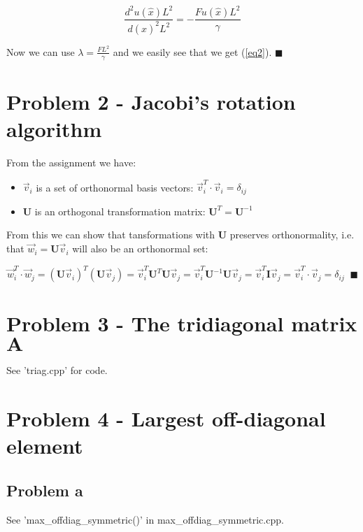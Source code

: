 \documentclass[english,notitlepage]{revtex4-1}  %
\begin{document}
\begin{equation*}
    \frac{d^2u(\hat{x})L^2}{d(\hat{x})^2L^2} = - \frac{Fu(\hat{x})L^2}{\gamma}
\end{equation*}

Now we can use $\lambda = \frac{FL^2}{\gamma}$ and we easily see that we get (\ref{eq2}). $\blacksquare$


\section*{Problem 2 - Jacobi’s rotation algorithm}

From the assignment we have:

\begin{itemize}
    \item $\vec{v}_i$ is a set of orthonormal basis vectors: $\vec{v}_i^T \cdot \vec{v}_i = \delta_{ij}$
    \item $\mathbf{U}$ is an orthogonal transformation matrix: $\mathbf{U}^T = \mathbf{U}^{-1}$
\end{itemize}

From this we can show that tansformations with $\mathbf{U}$ preserves orthonormality, i.e. that $\vec{w}_i = \mathbf{U} \vec{v}_i$ will also be an orthonormal set:

\begin{equation*}
    \vec{w}_i^T \cdot \vec{w}_j = (\mathbf{U}\vec{v}_i)^T (\mathbf{U} \vec{v}_j) = \vec{v}_i^T \mathbf{U}^T \mathbf{U} \vec{v}_j = \vec{v}_i^T \mathbf{U}^{-1} \mathbf{U} \vec{v}_j 
    = \vec{v}_i^T  \mathbf{I} \vec{v}_j = \vec{v}_i^T  \cdot \vec{v}_j = \delta_{ij} \;\; \blacksquare
\end{equation*}


\section*{Problem 3 - The tridiagonal matrix $\mathbf{A}$}
See 'triag.cpp' for code. 

\section*{Problem 4 - Largest off-diagonal element}

\subsection*{Problem a}
See 'max\_offdiag\_symmetric()' in max\_offdiag\_symmetric.cpp.
\end{document}
